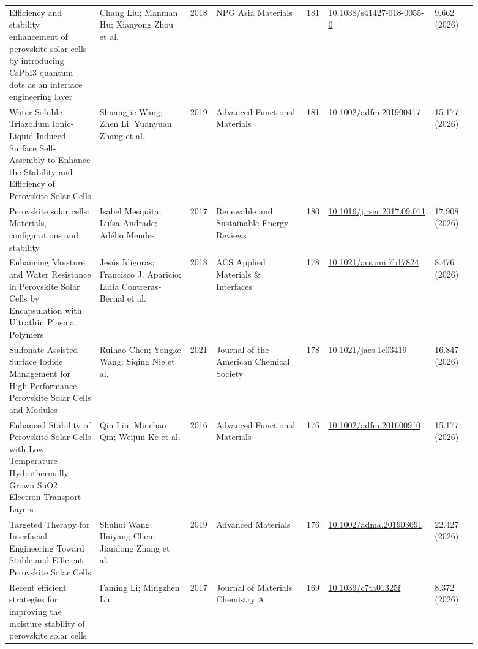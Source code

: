 \documentclass[10pt,a4paper]{article}
\begin{document}
{\begin{longtable}{p{0.197\linewidth}p{0.197\linewidth}p{0.043\linewidth}p{0.197\linewidth}p{0.043\linewidth}p{0.117\linewidth}p{0.098\linewidth}}
Efficiency and stability enhancement of perovskite solar cells by introducing CsPbI3 quantum dots as an interface engineering layer & Chang Liu; Manman Hu; Xianyong Zhou et al. & 2018 & NPG Asia Materials & 181 & \href{https://doi.org/10.1038/s41427-018-0055-0}{10.1038/s41427-018-0055-0} & 9.662 (2026) \\
Water‐Soluble Triazolium Ionic‐Liquid‐Induced Surface Self‐Assembly to Enhance the Stability and Efficiency of Perovskite Solar Cells & Shuangjie Wang; Zhen Li; Yuanyuan Zhang et al. & 2019 & Advanced Functional Materials & 181 & \href{https://doi.org/10.1002/adfm.201900417}{10.1002/adfm.201900417} & 15.177 (2026) \\
Perovskite solar cells: Materials, configurations and stability & Isabel Mesquita; Luísa Andrade; Adélio Mendes & 2017 & Renewable and Sustainable Energy Reviews & 180 & \href{https://doi.org/10.1016/j.rser.2017.09.011}{10.1016/j.rser.2017.09.011} & 17.908 (2026) \\
Enhancing Moisture and Water Resistance in Perovskite Solar Cells by Encapsulation with Ultrathin Plasma Polymers & Jesús Idígoras; Francisco J. Aparicio; Lidia Contreras‐Bernal et al. & 2018 & ACS Applied Materials \& Interfaces & 178 & \href{https://doi.org/10.1021/acsami.7b17824}{10.1021/acsami.7b17824} & 8.476 (2026) \\
Sulfonate-Assisted Surface Iodide Management for High-Performance Perovskite Solar Cells and Modules & Ruihao Chen; Yongke Wang; Siqing Nie et al. & 2021 & Journal of the American Chemical Society & 178 & \href{https://doi.org/10.1021/jacs.1c03419}{10.1021/jacs.1c03419} & 16.847 (2026) \\
Enhanced Stability of Perovskite Solar Cells with Low‐Temperature Hydrothermally Grown SnO2 Electron Transport Layers & Qin Liu; Minchao Qin; Weijun Ke et al. & 2016 & Advanced Functional Materials & 176 & \href{https://doi.org/10.1002/adfm.201600910}{10.1002/adfm.201600910} & 15.177 (2026) \\
Targeted Therapy for Interfacial Engineering Toward Stable and Efficient Perovskite Solar Cells & Shuhui Wang; Haiyang Chen; Jiandong Zhang et al. & 2019 & Advanced Materials & 176 & \href{https://doi.org/10.1002/adma.201903691}{10.1002/adma.201903691} & 22.427 (2026) \\
Recent efficient strategies for improving the moisture stability of perovskite solar cells & Faming Li; Mingzhen Liu & 2017 & Journal of Materials Chemistry A & 169 & \href{https://doi.org/10.1039/c7ta01325f}{10.1039/c7ta01325f} & 8.372 (2026) \\

\end{longtable}}
\end{document}
